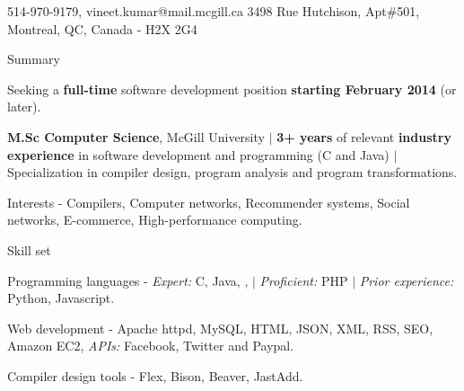 \documentclass{resume} %
\begin{document}
\begin{hSubsection}{514-970-9179, vineet.kumar@mail.mcgill.ca}
{%
}{3498 Rue Hutchison, Apt\#501, Montreal, QC, Canada - H2X 2G4}
\end{hSubsection}



\begin{rSection}{Summary}
\smallskip
\begin{lSubsection}
\item Seeking a \textbf{full-time} software development position
	\textbf{starting February 2014} (or later).
\item \textbf{M.Sc Computer Science}, McGill University $\vert$
	\textbf{3+ years} of relevant \textbf{industry experience} in software
	 development and programming (C and Java) $\vert$ Specialization in
	 compiler design, program analysis and program transformations.
  \item Interests - Compilers, Computer networks, Recommender systems, Social networks, E-commerce, High-performance computing. 
 \item Skill set
 \begin{lsubSubsection}
 	\item Programming languages - \emph{Expert:} C, Java, \xten, \matlab
$\vert$ \emph{Proficient:} PHP $\vert$ \emph{Prior experience:} Python, Javascript.
 	\item Web development - Apache httpd, MySQL, HTML, JSON, XML, RSS,
SEO, Amazon EC2, \emph{APIs:} Facebook, Twitter and Paypal.
 	\item Compiler design tools - Flex, Bison, Beaver, JastAdd.
 \end{lsubSubsection}
\end{lSubsection}
\end{rSection}
\end{document}
